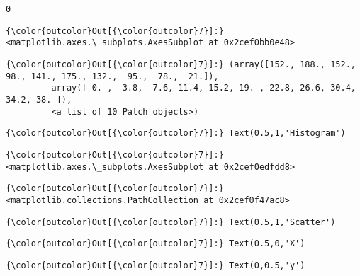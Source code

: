 \documentclass[11pt]{article}
\begin{document}
    \begin{Verbatim}[commandchars=\\\{\}]
0

    \end{Verbatim}

\begin{Verbatim}[commandchars=\\\{\}]
{\color{outcolor}Out[{\color{outcolor}7}]:} <matplotlib.axes.\_subplots.AxesSubplot at 0x2cef0bb0e48>
\end{Verbatim}
            
\begin{Verbatim}[commandchars=\\\{\}]
{\color{outcolor}Out[{\color{outcolor}7}]:} (array([152., 188., 152.,  98., 141., 175., 132.,  95.,  78.,  21.]),
         array([ 0. ,  3.8,  7.6, 11.4, 15.2, 19. , 22.8, 26.6, 30.4, 34.2, 38. ]),
         <a list of 10 Patch objects>)
\end{Verbatim}
            
\begin{Verbatim}[commandchars=\\\{\}]
{\color{outcolor}Out[{\color{outcolor}7}]:} Text(0.5,1,'Histogram')
\end{Verbatim}
            
\begin{Verbatim}[commandchars=\\\{\}]
{\color{outcolor}Out[{\color{outcolor}7}]:} <matplotlib.axes.\_subplots.AxesSubplot at 0x2cef0edfdd8>
\end{Verbatim}
            
\begin{Verbatim}[commandchars=\\\{\}]
{\color{outcolor}Out[{\color{outcolor}7}]:} <matplotlib.collections.PathCollection at 0x2cef0f47ac8>
\end{Verbatim}
            
\begin{Verbatim}[commandchars=\\\{\}]
{\color{outcolor}Out[{\color{outcolor}7}]:} Text(0.5,1,'Scatter')
\end{Verbatim}
            
\begin{Verbatim}[commandchars=\\\{\}]
{\color{outcolor}Out[{\color{outcolor}7}]:} Text(0.5,0,'X')
\end{Verbatim}
            
\begin{Verbatim}[commandchars=\\\{\}]
{\color{outcolor}Out[{\color{outcolor}7}]:} Text(0,0.5,'y')
\end{Verbatim}
            
\end{document}
